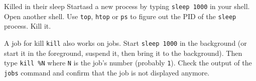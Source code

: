 \documentclass{TheAlternativeCourse}
\begin{document}
\begin{exercisebox}{Killed in their sleep}
	Startasd a new process by typing \texttt{sleep 1000} in your shell. Open another shell. Use \texttt{top}, \texttt{htop} or \texttt{ps} to figure out the PID of the \texttt{sleep} process. Kill it.
\end{exercisebox}

\begin{exercisebox}{A job for kill}
	\texttt{kill} also works on jobs. Start \texttt{sleep 1000} in the background (or start it in the foreground, suspend it, then bring it to the background). Then type \texttt{kill \%N} where \texttt{N} is the job's number (probably \texttt{1}). Check the output of the \texttt{jobs} command and confirm that the job is not displayed anymore.
\end{exercisebox}
\end{document}
